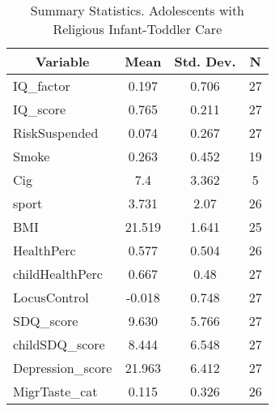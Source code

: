 
\begin{table}[htbp]\centering \caption{Summary Statistics. Adolescents with Religious Infant-Toddler Care \label{schoolAdolasiloReli}}
\begin{tabular}{l c c  c}\hline\hline
\multicolumn{1}{c}{\textbf{Variable}} & \textbf{Mean}
 & \textbf{Std. Dev.} & \textbf{N}\\ \hline
IQ\_factor & 0.197 & 0.706  & 27\\
IQ\_score & 0.765 & 0.211  & 27\\
RiskSuspended & 0.074 & 0.267  & 27\\
Smoke & 0.263 & 0.452  & 19\\
Cig & 7.4 & 3.362  & 5\\
sport & 3.731 & 2.07  & 26\\
BMI & 21.519 & 1.641  & 25\\
HealthPerc & 0.577 & 0.504  & 26\\
childHealthPerc & 0.667 & 0.48  & 27\\
LocusControl & -0.018 & 0.748  & 27\\
SDQ\_score & 9.630 & 5.766  & 27\\
childSDQ\_score & 8.444 & 6.548  & 27\\
Depression\_score & 21.963 & 6.412  & 27\\
MigrTaste\_cat & 0.115 & 0.326  & 26\\
\hline\end{tabular}
\end{table}
